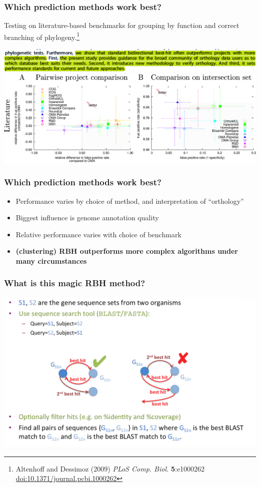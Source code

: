 \begin{frame}
  \frametitle{Which prediction methods work best?}
  Testing on literature-based benchmarks for grouping by function and correct branching of phylogeny.\footnote{\tiny{Altenhoff and Dessimoz (2009) \textit{PLoS Comp. Biol.} \textbf{5}:e1000262 \href{http://dx.doi.org/10.1371/journal.pcbi.1000262}{doi:10.1371/journal.pcbi.1000262}}}
  \begin{center}
      \includegraphics[width=1\textwidth]{images/altenhoff1} \\
      \includegraphics[width=1\textwidth]{images/altenhoff2}      
  \end{center}
\end{frame}

\begin{frame}
  \frametitle{Which prediction methods work best?}
  \begin{itemize}
    \item Performance varies by choice of method, and interpretation of ``orthology''
    \item Biggest influence is genome annotation quality
    \item Relative performance varies with choice of benchmark
    \item \textbf{(clustering) RBH outperforms more complex algorithms under many circumstances}
  \end{itemize}
\end{frame}

\begin{frame}
  \frametitle{What is this magic RBH method?}
  \begin{center}
      \includegraphics[width=1\textwidth]{images/rbbh}      
  \end{center}
\end{frame}